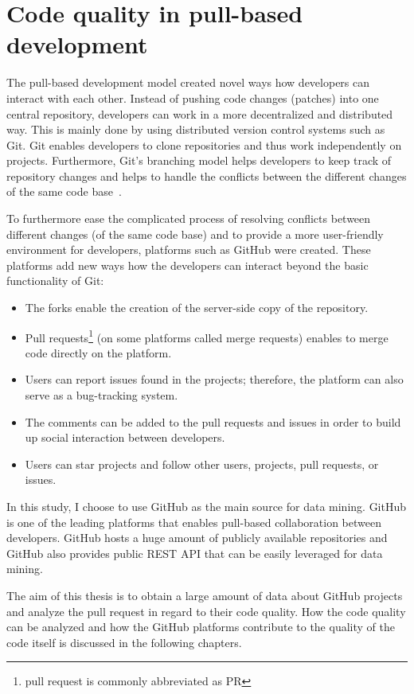 \documentclass[digital,oneside,oldtable,nolof,nolot,nocover]{fithesis4}
\begin{document}
\chapter{Code quality in pull-based development}
\label{sec:org3c6013d}
The pull-based development model created novel ways how developers can
interact with each other. Instead of pushing code changes (patches) into
one central repository, developers can work in a more decentralized and
distributed way. This is mainly done by using distributed version control
systems such as Git. Git enables developers to clone repositories and thus
work independently on projects. Furthermore, Git's branching model helps
developers to keep track of repository changes and helps to handle the
conflicts between the different changes of the same code base~\cite{exploratory}.

To furthermore ease the complicated process of resolving conflicts between
different changes (of the same code base) and to provide a more user-friendly
environment for developers, platforms such as GitHub were created. These
platforms add new ways how the developers can interact beyond the basic
functionality of Git:
\begin{itemize}
\item The forks enable the creation of the server-side copy of the repository.
\item Pull requests\footnote{pull request is commonly abbreviated as PR}
(on some platforms called merge requests) enables to merge code directly on the platform.
\item Users can report issues found in the projects; therefore, the platform can also serve as a bug-tracking system.
\item The comments can be added to the pull requests and issues in order to build up social interaction between developers.
\item Users can star projects and follow other users, projects, pull requests, or issues.
\end{itemize}

In this study, I choose to use GitHub as the main source for data
mining. GitHub is one of the leading platforms that enables pull-based
collaboration between developers. GitHub hosts a huge amount of publicly
available repositories and GitHub also provides public REST API that can be
easily leveraged for data mining.

The aim of this thesis is to obtain a large amount of data about GitHub projects
and analyze the pull request in regard to their code quality. How the code
quality can be analyzed and how the GitHub platforms contribute to the quality of
the code itself is discussed in the following chapters.
\end{document}
